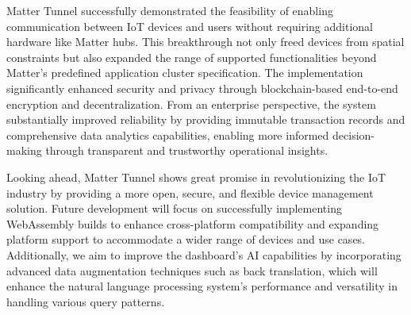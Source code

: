 \documentclass[conference]{IEEEtran}
\begin{document}
Matter Tunnel successfully demonstrated the feasibility of enabling communication between IoT devices and users without requiring additional hardware like Matter hubs. This breakthrough not only freed devices from spatial constraints but also expanded the range of supported functionalities beyond Matter's predefined application cluster specification. The implementation significantly enhanced security and privacy through blockchain-based end-to-end encryption and decentralization. From an enterprise perspective, the system substantially improved reliability by providing immutable transaction records and comprehensive data analytics capabilities, enabling more informed decision-making through transparent and trustworthy operational insights.

Looking ahead, Matter Tunnel shows great promise in revolutionizing the IoT industry by providing a more open, secure, and flexible device management solution. Future development will focus on successfully implementing WebAssembly builds to enhance cross-platform compatibility and expanding platform support to accommodate a wider range of devices and use cases. Additionally, we aim to improve the dashboard's AI capabilities by incorporating advanced data augmentation techniques such as back translation, which will enhance the natural language processing system's performance and versatility in handling various query patterns.
\end{document}
